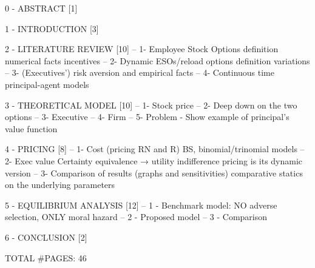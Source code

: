 
0 - ABSTRACT [1]

1 - INTRODUCTION [3]


2 - LITERATURE REVIEW [10]
-- 1- Employee Stock Options
        definition 
        numerical facts
        incentives
-- 2- Dynamic ESOs/reload options
        definition
        variations
-- 3- (Executives') risk aversion and empirical facts
-- 4- Continuous time principal-agent models


3 - THEORETICAL MODEL [10]
-- 1- Stock price
-- 2- Deep down on the two options
-- 3- Executive 
-- 4- Firm 
-- 5- Problem
        - Show example of principal's value function


4 - PRICING [8]
-- 1- Cost (pricing RN and R)
        BS, binomial/trinomial models
-- 2- Exec value
        Certainty equivalence → utility indifference pricing is its dynamic version
-- 3- Comparison of results (graphs and sensitivities)
        comparative statics on the underlying parameters


5 - EQUILIBRIUM ANALYSIS [12]
-- 1 - Benchmark model: NO adverse selection, ONLY moral hazard %
-- 2 - Proposed model %
-- 3 - Comparison 


6 - CONCLUSION [2]


TOTAL #PAGES: 46

